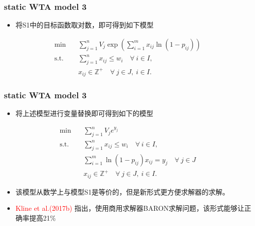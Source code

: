 \documentclass[CJK,10pt]{beamer}
\begin{document}
\begin{frame}
    \frametitle{static WTA model 3}
    \begin{itemize}
        \item 将S1中的目标函数取对数，即可得到如下模型
    \end{itemize}
    \begin{align*} \tag{S3.1}
        \min\quad & \sum_{j=1}^n V_j \exp \left( \sum_{i=1}^m {x_{ij}\ln(1 -  p_{ij})} \right) \\ 
        \mathrm{s. t.}\quad &\sum_{j=1}^n x_{ij} \leq w_i\quad \forall ~i \in I,\\
        & x_{ij} \in \mathbb{Z}^+ \quad \forall~ j\in J , ~ i \in I.
    \end{align*}
\end{frame}

\begin{frame}
    \frametitle{static WTA model 3}
    \begin{itemize}
        \item 将上述模型进行变量替换即可得到如下的模型
    \end{itemize}
    \begin{align*} \tag{S3.2}
        \min\quad & \sum_{j=1}^n V_j e^{y_j}  \\ 
        \mathrm{s. t.}\quad &\sum_{j=1}^n x_{ij} \leq w_i\quad \forall ~i \in I,\\
        & \sum_{i=1}^m {\ln(1 -  p_{ij}) x_{ij}} = y_j \quad \forall ~ j \in J\\
        & x_{ij} \in \mathbb{Z}^+ \quad \forall~ j\in J , ~ i \in I.
    \end{align*}
    \begin{itemize}
        \item 该模型从数学上与模型S1是等价的，但是新形式更方便求解器的求解。
        \item \textcolor{red}{Kline et al.(2017b)} 指出，使用商用求解器BARON求解问题，该形式能够让正确率提高21\%
    \end{itemize}
\end{frame}
\end{document}
